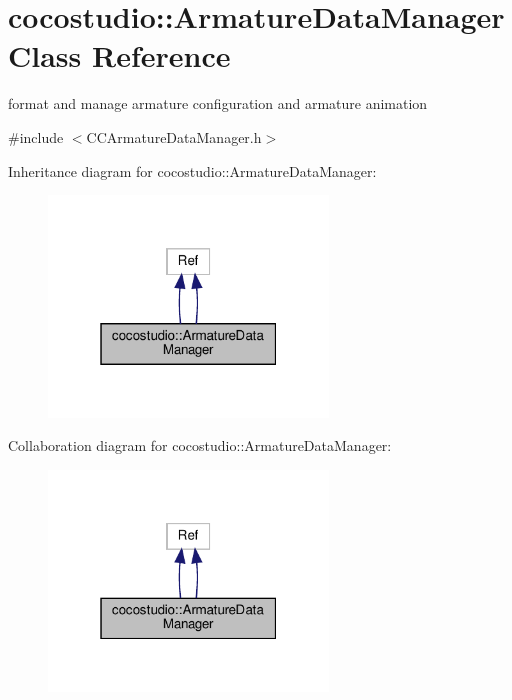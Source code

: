 \hypertarget{classcocostudio_1_1ArmatureDataManager}{}\section{cocostudio\+:\+:Armature\+Data\+Manager Class Reference}
\label{classcocostudio_1_1ArmatureDataManager}


format and manage armature configuration and armature animation  




{\ttfamily \#include $<$C\+C\+Armature\+Data\+Manager.\+h$>$}



Inheritance diagram for cocostudio\+:\+:Armature\+Data\+Manager\+:
\nopagebreak
\begin{figure}[H]
\begin{center}
\leavevmode
\includegraphics[width=211pt]{classcocostudio_1_1ArmatureDataManager__inherit__graph}
\end{center}
\end{figure}


Collaboration diagram for cocostudio\+:\+:Armature\+Data\+Manager\+:
\nopagebreak
\begin{figure}[H]
\begin{center}
\leavevmode
\includegraphics[width=211pt]{classcocostudio_1_1ArmatureDataManager__coll__graph}
\end{center}
\end{figure}
